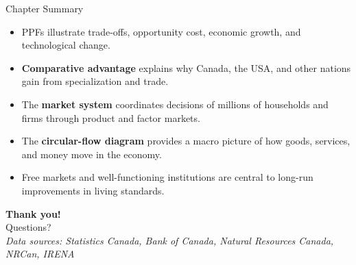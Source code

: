 \documentclass[aspectratio=169]{beamer}
\begin{document}
\begin{frame}{Chapter Summary}
\transfade
\begin{itemize}
  \item PPFs illustrate trade-offs, opportunity cost, economic growth, and technological change.
  \item \textbf{Comparative advantage} explains why Canada, the USA, and other nations gain from specialization and trade.
  \item The \textbf{market system} coordinates decisions of millions of households and firms through product and factor markets.
  \item The \textbf{circular-flow diagram} provides a macro picture of how goods, services, and money move in the economy.
  \item Free markets and well-functioning institutions are central to long-run improvements in living standards.
\end{itemize}
\end{frame}

\begin{frame}
\centering
\Huge \textbf{Thank you!}\\[1em]
\normalsize Questions? \\[0.5em]
\small \textit{Data sources: Statistics Canada, Bank of Canada, Natural Resources Canada, NRCan, IRENA}
\end{frame}
\end{document}
